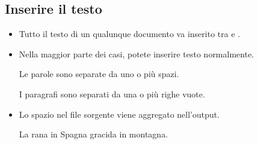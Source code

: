 \documentclass{beamer}
\begin{document}
\subsection{Inserire il testo}
\begin{frame}[fragile]{\insertsubsection{}}
\small
\begin{itemize}
\item Tutto il testo di un qualunque documento va inserito tra 
e .
\item Nella maggior parte dei casi, potete inserire testo normalmente.
\begin{exampletwouptiny}
Le parole sono separate da uno o pi\`u
spazi.

I paragrafi sono separati da una o pi\`u
righe vuote.
\end{exampletwouptiny}
\item Lo spazio nel file sorgente viene aggregato nell'output.
\begin{exampletwouptiny}
La   rana       in Spagna
gracida in		 montagna.
\end{exampletwouptiny}
\end{itemize}
\end{frame}
\end{document}
